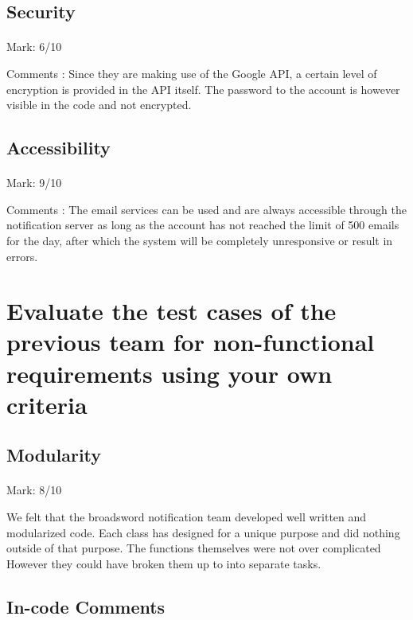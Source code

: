 \documentclass[11pt]{article}
\begin{document}
	\subsection{Security}
		\paragraph{} Mark: 6/10
		\noindent
		\begin{center}
			Comments : Since they are making use of the Google API, a certain level of encryption is provided in the API itself. The password to the account is however visible in the code and not encrypted. 
		\end{center}

	\subsection{Accessibility}
		\paragraph{} Mark: 9/10
		\noindent
		\begin{center}
			Comments : The email services can be used and are always accessible through the notification server as long as the account has not reached the limit of 500 emails for the day, after which the system will be completely unresponsive or result in errors.
		\end{center}

\section{Evaluate the test cases of the previous team for non-functional requirements using your own criteria}	
	\subsection{Modularity}
		\paragraph{} Mark: 8/10
		\noindent
		\begin{center}
			We felt that the broadsword notification team developed well written and modularized code. Each class has designed for a unique purpose and did nothing outside of that purpose. The functions themselves were not over complicated However they could have broken them up to into separate tasks.
		\end{center}
	\subsection{In-code Comments}
\end{document}
